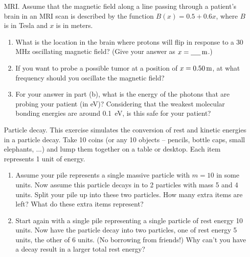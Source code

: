 \begin{aproblem}{MRI.} 
  Assume that the magnetic field along a line passing through a
  patient's brain in an MRI scan is described by the function $B(x) =
  0.5 + 0.6x$, where $B$ is in Tesla and $x$ is in meters.

  \begin{enumerate}
  \item What is the location in the brain where protons will flip in
    response to a 30\, MHz oscillating magnetic field?  (Give your
    answer as $x = \mbox{\underline{\hspace{0.2in}}}\,\mbox{m}$.)
  \item If you want to probe a possible tumor at a position of $x =
    0.50\,\mbox{m}$, at what frequency should you oscillate the
    magnetic field?
  \item For your answer in part (b), what is the energy of the photons
    that are probing your patient (in eV)?  Considering that the
    weakest molecular bonding energies are around 0.1\, eV, is this
    safe for your patient?
  \end{enumerate}
\end{aproblem}


\begin{aproblem}{Particle decay.}  
  This exercise simulates the conversion of rest and kinetic energies
  in a particle decay. Take 10 coins (or any 10 objects -- pencils,
  bottle caps, small elephants, ...) and lump them together on a table
  or desktop. Each item represents 1 unit of energy.

  \begin{enumerate}
  \item Assume your pile represents a single massive particle with $m
    = 10$ in some units.  Now assume this particle decays in to 2
    particles with mass 5 and 4 units.  Split your pile up into these
    two particles.  How many extra items are left?  What do these
    extra items represent?

  \item Start again with a single pile representing a single particle
    of rest energy 10 units.  Now have the particle decay into two
    particles, one of rest energy 5 units, the other of 6 units.  (No
    borrowing from friends!)  Why can't you have a decay result in a
    larger total rest energy?

  \end{enumerate}
\end{aproblem}


